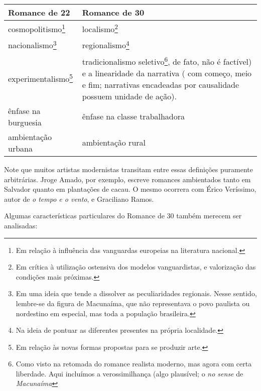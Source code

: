\begin{table}[h]
\centering
\begin{tabular}{l l}
\toprule
\textbf{Romance de 22} & \textbf{Romance de 30} \\
\midrule
cosmopolitismo\footnote{Em relação à influência das vanguardas europeias na literatura nacional.} & localismo\footnote{Em crítica à utilização ostensiva dos modelos vanguardistas, e valorização das condições mais próximas.} \\
nacionalismo\footnote{Em uma ideia que tende a dissolver as peculiaridades regionais. Nesse sentido, lembre-se da figura de Macunaíma, que não representava o povo paulista ou nordestino em especial, mas toda a população brasileira.} & regionalismo\footnote{Na ideia de pontuar as diferentes presentes na própria localidade.} \\
experimentalismo\footnote{Em relação às novas formas propostas para se produzir arte.} & tradicionalismo seletivo\footnote{Como visto na retomada do romance realista moderno, mas agora com certa liberdade. Aqui incluímos a verossimilhança (algo plausível; o \textit{no sense} de \textit{Macunaíma}}, de fato, não é factível) e a linearidade da narrativa ( com começo, meio e fim; narrativas encadeadas por causalidade possuem unidade de ação). \\
ênfase na burguesia & ênfase na classe trabalhadora \\
ambientação urbana & ambientação rural \\
\bottomrule
\end{tabular}
\end{table}

Note que muitos artistas modernistas transitam entre essas definições puramente arbitrárias. Jroge Amado, por exemplo, escreve romances ambientados tanto em Salvador quanto em plantações de cacau. O mesmo ocorrera com Érico Veríssimo, autor de \textit{o tempo e o vento}, e Graciliano Ramos.

Algumas características particulares do Romance de 30 também merecem ser analisadas:

